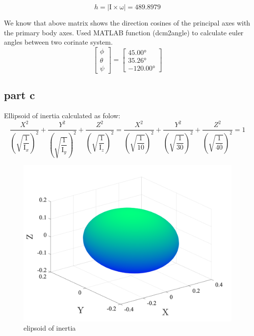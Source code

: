 $$
h = |\boldsymbol{\mathrm{I}} \times \boldsymbol{\mathrm{\omega}}| = 489.8979
$$

We know that above matrix shows the direction cosines of the principal axes with the primary body axes. Used MATLAB function (dcm2angle) to calculate euler angles between two corinate system.
$$
\begin{bmatrix}
    \phi\\
    \theta\\
    \psi 
\end{bmatrix} = \begin{bmatrix}
  \ang{45.00}\\
  \ang{35.26}\\
  \ang{-120.00}
\end{bmatrix}
$$

\subsection{part c}
Ellipsoid of inertia calculated as folow:
\begin{equation}
    \dfrac{X^2}{\left(\sqrt{\dfrac{1}{\mathrm{I}_x}}\right)^2} + 
    \dfrac{Y^2}{\left(\sqrt{\dfrac{1}{\mathrm{I}_y}}\right)^2} + 
    \dfrac{Z^2}{\left(\sqrt{\dfrac{1}{\mathrm{I}_z}}\right)^2} =
    \dfrac{X^2}{\left(\sqrt{\dfrac{1}{10}}\right)^2} + 
    \dfrac{Y^2}{\left(\sqrt{\dfrac{1}{30}}\right)^2} + 
    \dfrac{Z^2}{\left(\sqrt{\dfrac{1}{40}}\right)^2} =
     1
\end{equation} 

\begin{figure}[H]
    \caption{elipsoid of inertia}
    \centering
    \includegraphics[width=17cm]{../Figure/Q1/3Dof_view_elipsoid_inertia}
\end{figure}

